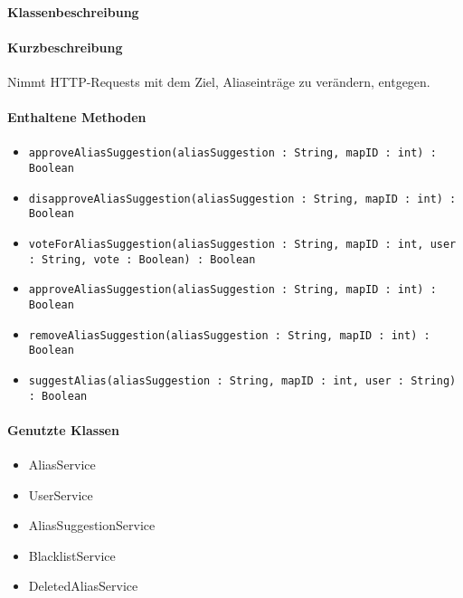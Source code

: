 \paragraph*{Klassenbeschreibung}%
\paragraph*{Kurzbeschreibung}
Nimmt HTTP-Requests mit dem Ziel, Aliaseinträge zu verändern, entgegen.
\paragraph*{Enthaltene Methoden}
\begin{itemize}
    \item \texttt{approveAliasSuggestion(aliasSuggestion : String, mapID : int) : Boolean}
    \item \texttt{disapproveAliasSuggestion(aliasSuggestion : String, mapID : int) : Boolean}
    \item \texttt{voteForAliasSuggestion(aliasSuggestion : String, mapID : int, user : String, vote : Boolean) : Boolean}
    \item \texttt{approveAliasSuggestion(aliasSuggestion : String, mapID : int) : Boolean}
    \item \texttt{removeAliasSuggestion(aliasSuggestion : String, mapID : int) : Boolean}
    \item \texttt{suggestAlias(aliasSuggestion : String, mapID : int, user : String) : Boolean}


\end{itemize}
\paragraph*{Genutzte Klassen}
\begin{itemize}
    \item AliasService
    \item UserService
    \item AliasSuggestionService
    \item BlacklistService
    \item DeletedAliasService
\end{itemize}
